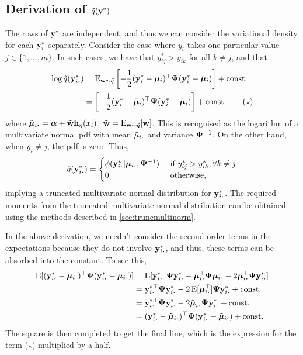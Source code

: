 \subsection{Derivation of \texorpdfstring{$\tilde q({\mathbf y}^*)$}{$\tilde q(y^*)$}}

The rows of ${\mathbf y}^*$ are independent, and thus we can consider the variational density for each ${\mathbf y}_i^*$ separately.
Consider the case where $y_i$ takes one particular value $j \in \{1,\dots,m\}$. 
In such cases, we have that $y_{ij}^* > y_{ik}$ for all $k\neq j$, and that
\begin{align*}
  \log \tilde q(\by_{i \bigcdot}^*) 
  &=  \E_{\bw\sim \tilde q} \left[ - \half (\by^*_i - \bmu_i)^\top \bPsi (\by^*_i - \bmu_i)  \right] + \const \\
  &= \left[ - \half (\by^*_i - \tilde\bmu_i)^\top \bPsi (\by^*_i - \tilde\bmu_i)  \right] + \const \tag{$\star$} 
\end{align*}
where $\tilde\bmu_{i \bigcdot} = \balpha + \tilde\bw\bh_\eta(x_i)$,  $\tilde{{\mathbf w}} = \operatorname{E}_{{\mathbf w}\sim\tilde q}[{\mathbf w}]$.
This is recognised as the logarithm of a multivariate normal pdf with mean $\tilde \mu_{i \bigcdot}$ and variance ${\bm\Psi}^{-1}$.
On the other hand, when $y_i \neq j$, the pdf is zero.
Thus,
\begin{align*}
  \tilde q(\by_{i \bigcdot}^*) =
  \begin{cases}
    \phi(\by_{i \bigcdot}^*|\bmu_{i \bigcdot},\bPsi^{-1}) & \text{ if } y_{ij}^* > y_{ik}^*, \forall k \neq j \\
    0 & \text{ otherwise,} \\
  \end{cases}
\end{align*}
implying a truncated multivariate normal distribution for $\by_{i \bigcdot}^*$.
The required moments from the truncated multivariate normal distribution can be obtained using the methods described in \cref{sec:truncmultinorm}.


\begin{remark}
  In the above derivation,  we needn't consider the second order terms in the expectations because they do not involve $\by^*_{i \bigcdot}$, and thus, these terms can be absorbed into the constant.
  To see this,
  \begin{align*}
    \E[(\by^*_{i \bigcdot} - \bmu_{i \bigcdot})^\top \bPsi (\by^*_{i \bigcdot} - \bmu_{i \bigcdot})]
    &= \E[\by^{*\top}_{i \bigcdot}\bPsi \by^*_{i \bigcdot} + \bmu_{i \bigcdot}^\top \bPsi \bmu_{i \bigcdot} - 2\bmu_{i \bigcdot}^\top\bPsi\by^*_{i \bigcdot}] \\
    &= \by^{*\top}_{i \bigcdot}\bPsi \by^*_{i \bigcdot} - 2 \E[\bmu_{i \bigcdot}^\top] \bPsi \by^*_{i \bigcdot} + \const \\
    &= \by^{*\top}_{i \bigcdot} \bPsi \by^*_{i \bigcdot} - 2 \tilde\bmu_{i \bigcdot} ^\top\bPsi\by^*_{i \bigcdot} + \const \\
    &= (\by^*_{i \bigcdot} - \tilde\bmu_{i \bigcdot})^\top \bPsi (\by^*_{i \bigcdot} - \tilde\bmu_{i \bigcdot}) + \const
  \end{align*}
  The square is then completed to get the final line, which is the expression for the term ($\star$) multiplied by a half.
\end{remark}


